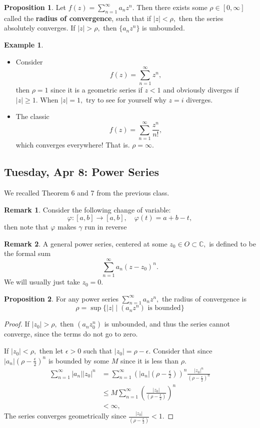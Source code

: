 \documentclass[10pt, oneside]{article}
\newcommand{\bbC}{\mathbb{C}}
\theoremstyle{definition}
\newtheorem{exmp}{Example}[section]
\newtheorem{prop}{Proposition}
\newtheorem{rem}{Remark}
\begin{document}
\begin{prop}
    Let $f(z) = \sum_{n=1}^\infty a_n z^n.$ Then there exists some $\rho \in [0, \infty]$ called the \textbf{radius of convergence},  such that if $|z| < \rho,$ then the series absolutely converges. If $|z| > \rho,$ then $\{a_nz^n\}$ is unbounded.
\end{prop}
\begin{exmp}
    \begin{itemize}
        \item Consider 
        \[f(z) = \sum_{n=1  }^\infty z^n,\] then $\rho = 1$ since it is a geometric series if $z < 1$ and obviously diverges if $|z|\geq 1.$ When $|z| = 1,$ try to see for yourself why $z = i$ diverges. 
        \item The classic 
        \[f(z) = \sum_{n=1}^\infty \frac{z^n}{n!},\] which converges everywhere! That is. $\rho = \infty.$
    \end{itemize}
\end{exmp}

\newpage
\subsection{Tuesday, Apr 8: Power Series}
We recalled Theorem 6 and 7 from the previous class.

\begin{rem}
    Consider the following change of variable: 
    \[\varphi: [a,b]\to [a,b], \quad \varphi(t) = a + b - t,\] then note that $\varphi$ makes $\gamma$ run in reverse
\end{rem}

\begin{rem}
    A general power series, centered at some $z_0 \in O \subset \bbC,$ is defined to be the formal sum
    \[\sum_{n=1}^\infty a_n(z - z_0)^n.\] We will usually just take $z_0 = 0.$ 
\end{rem}

\begin{prop}
    For any power series $ \sum_{n=1}^\infty a_n z^n,$ the radius of convergence is 
    \[\rho = \sup\{|z| \mid (a_nz^n) \text{ is bounded}\}\]
\end{prop}
\begin{proof}
    If $|z_0| > \rho,$ then $(a_n z_0^n)$ is unbounded, and thus the series cannot converge, since the terms do not go to zero.

    If $|z_0| < \rho,$ then let $\epsilon >0$ such that $|z_0| = \rho - \epsilon.$ Consider that since $|a_n|(\rho - \frac{\epsilon}{2})^n$ is bounded by some $M$ since it is less than $\rho.$
    \begin{align*}
        \sum_{n=1}^\infty |a_n||z_0|^n &= \sum_{n=1}^\infty(|a_n|( \rho - \frac{\epsilon}{2}))^n \frac{|z_0|^n}{(\rho - \frac{\epsilon}{2})^n}\\
        &\leq M\sum_{n=1}^\infty \left(\frac{|z_0|}{(\rho - \frac{\epsilon}{2})}\right)^n\\
        &< \infty,
    \end{align*}
    The series converges geometrically since $\frac{|z_0|}{(\rho - \frac{\epsilon}{2})} < 1.$
\end{proof}
\end{document}
